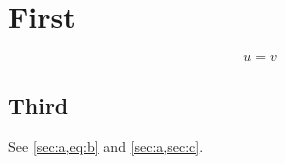 \documentclass{article}
\begin{document}
\section{First}\label{sec:a}
\begin{equation}\label{eq:b} u = v \end{equation}
\subsection{Third}\label{sec:c}
See \cref{sec:a,eq:b} and \cref*{sec:a,sec:c}.
\end{document}
